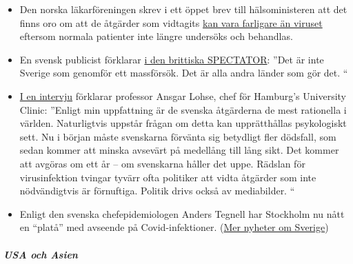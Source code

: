 \begin{itemize}
\tightlist
\item
  Den norska läkarföreningen skrev i ett öppet brev till hälsoministeren
  att det finns oro om att de åtgärder som vidtagits
  \href{https://www.abcnyheter.no/helse-og-livsstil/helse/2020/04/06/195667780/nesten-halvparten-av-sengene-pa-oslo-universitetssykehus-star-tomme}{kan
  vara farligare än viruset} eftersom normala patienter inte längre
  undersöks och behandlas.
\item
  En svensk publicist förklarar
  \href{https://www.spectator.co.uk/article/no-lockdown-please-w-re-swedish}{i
  den brittiska SPECTATOR}: ''Det är inte Sverige som genomför ett
  massförsök. Det är alla andra länder som gör det. ``
\item
  \href{https://www.abendblatt.de/hamburg/article228880917/uke-professor-shutdown-lohse-deutschland-hamburg-corona-virus-infektion-covid-19-impfstoff-coronavirus-krise-patienten-immunitaet-krankenhaeuser-kontaktverbot-kliniken-infektionsrate.html}{I
  en intervju} förklarar professor Ansgar Lohse, chef för Hamburg's
  University Clinic: ''Enligt min uppfattning är de svenska åtgärderna
  de mest rationella i världen. Naturligtvis uppstår frågan om detta kan
  upprätthållas psykologiskt sett. Nu i början måste svenskarna förvänta
  sig betydligt fler dödsfall, som sedan kommer att minska avsevärt på
  medellång till lång sikt. Det kommer att avgöras om ett år -- om
  svenskarna håller det uppe. Rädslan för virusinfektion tvingar tyvärr
  ofta politiker att vidta åtgärder som inte nödvändigtvis är
  förnuftiga. Politik drivs också av mediabilder. ``
\item
  Enligt den svenska chefepidemiologen Anders Tegnell har Stockholm nu
  nått en ``platå'' med avseende på Covid-infektioner.
  (\href{https://www.thelocal.se/20200310/timeline-how-the-coronavirus-has-developed-in-sweden}{Mer
  nyheter om Sverige})
\end{itemize}

\hypertarget{usa-och-asien}{%
\subparagraph{\texorpdfstring{\textbf{USA och
Asien}}{USA och Asien}}\label{usa-och-asien}}

